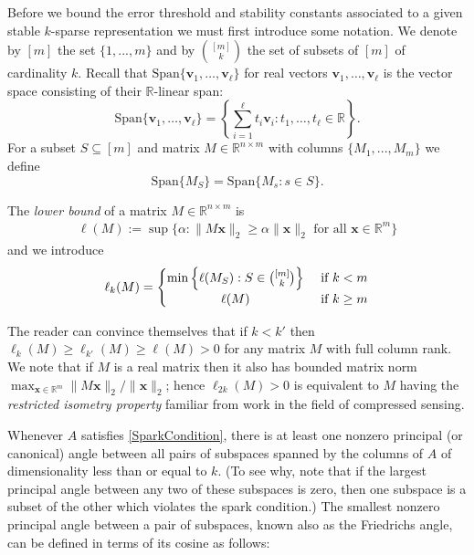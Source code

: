 \documentclass[journal, onecolumn]{IEEEtran}
\begin{document}
Before we bound the error threshold and stability constants associated to a given stable $k$-sparse representation we must first introduce some notation. We denote by $[m]$ the set $\{1, ..., m\}$ and by ${[m] \choose k}$ the set of subsets of $[m]$ of cardinality $k$. Recall that $\text{Span}\{\mathbf{v}_1, \ldots, \mathbf{v}_\ell\}$ for real vectors $\mathbf{v}_1, \ldots, \mathbf{v}_\ell$ is the vector space consisting of their $\mathbb{R}$-linear span:
%
\[ \text{Span}\{\mathbf{v}_1, \ldots, \mathbf{v}_\ell\} = \left\{ \sum_{i=1}^\ell t_i\mathbf{v}_i : t_1, \ldots, t_\ell \in \mathbb{R}\right\}. \]
%
For a subset $S \subseteq [m]$ and matrix $M \in \mathbb{R}^{n \times m}$ with columns $\{M_1,...,M_m\}$ we define
%
\[ \text{Span}\{M_S\} = \text{Span}\{M_s: s \in S\}. \]

The \emph{lower bound} of a matrix $M \in \mathbb{R}^{n \times m}$ \cite{refs?} is 
\begin{align*}
\ell(M) := \sup \{ \alpha : \|M\mathbf{x}\|_2 \geq \alpha\|\mathbf{x}\|_2 \text{ for all } \mathbf{x} \in \mathbb{R}^m\}
\end{align*}
%
and we introduce 
\[
 \ell_k(M) =
  \begin{cases} 
      \hfill \min \left\{ \ell(M_S) : S \in {[m] \choose k} \right\} \hfill & \text{ if $k < m$} \\
      \hfill \ell(M) \hfill & \text{ if $k \geq m$} \\
  \end{cases}
\]

The reader can convince themselves that if $k < k'$ then $\ell_{k}(M) \geq \ell_{k'}(M) \geq \ell(M) > 0$ for any matrix $M$ with full column rank. We note that if $M$ is a real matrix then it also has bounded matrix norm $\max_{\mathbf{x} \in \mathbb{R}^m}\|M\mathbf{x}\|_2 / \|\mathbf{x}\|_2$; hence $\ell_{2k}(M) > 0$ is equivalent to $M$ having the \emph{restricted isometry property} \cite{CandesTao05} familiar from work in the field of compressed sensing.

Whenever $A$ satisfies \eqref{SparkCondition}, there is at least one nonzero principal (or canonical) angle between all pairs of subspaces spanned by the columns of $A$ of dimensionality less than or equal to $k$. (To see why, note that if the largest principal angle between any two of these subspaces is zero, then one subspace is a subset of the other which violates the spark condition.) The smallest nonzero principal angle between a pair of subspaces, known also as the Friedrichs angle, can be defined in terms of its cosine as follows:
\end{document}
